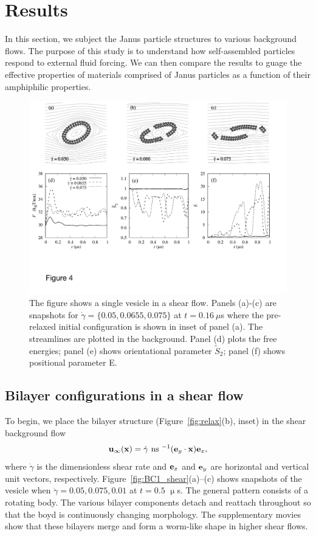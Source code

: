 \documentclass[prb,preprint,showpacs,preprintnumbers,amsmath,amssymb,longbibliography]{revtex4-1}
\newcommand{\xx}{\mathbf{x}}
\newcommand{\uu}{\mathbf{u}}
\begin{document}
\section{Results}
\label{sec:results}
In this section, we subject the Janus particle structures to various background
flows.  The purpose of this study is to understand how self-assembled particles
respond to external fluid forcing.  We can then compare the results to guage
the effective properties of materials comprised of Janus particles as a function
of their amphiphilic properties.  
\begin{figure}
  \begin{center}
    \includegraphics[width=1.0\textwidth]{Figures/Figure4.pdf}
  \end{center}
  \caption{
    \label{fig:Ves_shear}
The figure shows a single vesicle in a shear flow. Panels (a)-(c) are snapshots for $\dot \gamma = \{0.05, 0.0655, 0.075\}$ at $t=0.16\ \mu$s where the pre-relaxed initial configuration is shown in inset of panel (a).
The streamlines are plotted in the background.
Panel (d) plots the free energies; panel (e) shows orientational parameter $\tilde{S}_2$; panel (f) shows positional parameter E.
     }
\end{figure}

\subsection{Bilayer configurations in a shear flow}
To begin, we place the bilayer structure (Figure~\ref{fig:relax}(b), inset)
in the shear background flow
\begin{equation}
\uu_\infty(\xx) = \dot\gamma \text{ ns }^{-1} ({\bf e}_y\cdot\xx){\bf e}_x,
\end{equation}
%
where $\dot\gamma$ is the dimensionless shear rate and ${\bf e}_x$ and ${\bf e}_y$
are horizontal and vertical unit vectors, respectively.  
Figure~\ref{fig:BC1_shear}(a)--(c)
shows snapshots of the vesicle when $\dot\gamma= 0.05,0.075,0.01$
at $t = 0.5$ $\upmu$s.
The general pattern consists of a rotating body.  The various bilayer components
detach and reattach throughout so that the boyd is continuously changing morphology.
The supplementary movies show that these bilayers merge and form a worm-like shape in higher 
shear flows.
\end{document}
